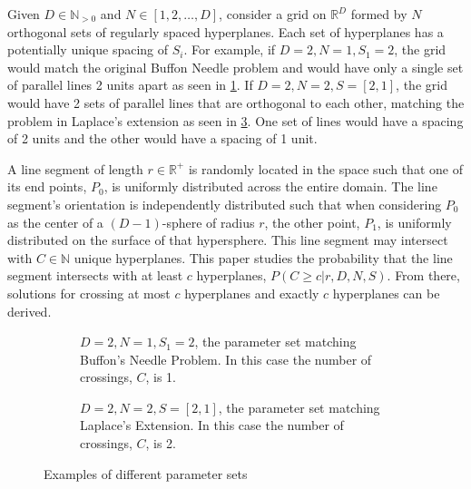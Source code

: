 \documentclass{article}
\begin{document}
Given $D\in\mathbb{N}_{>0}$ and $N\in[1,2,\dots,D]$, consider a grid on $\mathbb{R}^D$ formed by $N$ orthogonal sets of regularly spaced hyperplanes. Each set of hyperplanes
has a potentially unique spacing of $S_i$. For example, if $D=2, N=1, S_1=2$, the grid would match the original Buffon Needle problem and would have only a single set of parallel lines 2 units apart as seen in \ref{fig:buffon example}.
If $D=2, N=2, S=[2, 1]$, the grid would have 2 sets of parallel lines that are orthogonal to each other, matching the problem in Laplace's extension as seen in \ref{fig:laplace example}. One set of lines would have a spacing of 2 units and 
the other would have a spacing of 1 unit.

A line segment of length $r\in\mathbb{R}^+$ is randomly located in the space such that one of its end points, $P_0$, is uniformly distributed
across the entire domain. The line segment's orientation is independently distributed such that when considering $P_0$ as the center of a $(D-1)$-sphere of radius $r$, the other point, $P_1$,
is uniformly distributed on the surface of that hypersphere. This line segment may intersect with $C\in\mathbb{N}$ unique hyperplanes. This paper studies the probability that the line segment
intersects with at least $c$ hyperplanes, $P(C\ge c|r, D, N, S)$. From there, solutions for crossing at most $c$ hyperplanes and exactly $c$ hyperplanes can
be derived.
\begin{figure}[H]
	\centering
	\begin{subfigure}{0.45\textwidth}
		\centering
		\caption{$D=2, N=1, S_1=2$, the parameter set matching Buffon's Needle Problem. In this case the number of crossings, $C$, is 1.}
		\label{fig:buffon example}
	\end{subfigure}
	\hspace{1cm}
	\begin{subfigure}{0.45\textwidth}
		\centering
		\caption{$D=2, N=2, S=[2,1]$, the parameter set matching Laplace's Extension. In this case the number of crossings, $C$, is 2.}
		\label{fig:laplace example}
	\end{subfigure}
	\caption{Examples of different parameter sets}
\end{figure}
\end{document}
